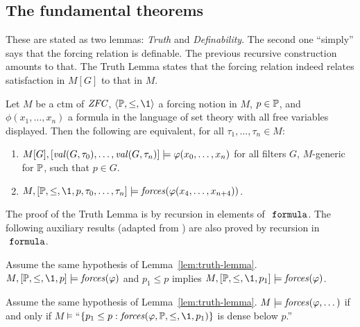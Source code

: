 \subsection{The fundamental theorems}
These are stated as two lemmas: \emph{Truth} and
\emph{Definability}. The second one ``simply'' says that the forcing
relation is definable. The previous recursive construction amounts to
that. The Truth Lemma states that the forcing relation indeed relates
satisfaction in $M[G]$ to that in $M$. 
\begin{lemma}\label{lem:truth-lemma}
  Let $M$ be a ctm of $\mathit{ZFC}$, $\lb\PP,\leq,\1\rb$ a forcing notion
  in $M$, $p\in\mathbb{P}$, and $\phi(x_1,\dots,x_n)$ a formula in the
  language of set 
  theory with all free variables displayed. Then the
  following are equivalent, for all $\tau_1,\dots,\tau_n\in M$: 
  \begin{enumerate}
  \item $M[G],[\operatorname{\mathit{val}}(G,\tau_0),\dots,\operatorname{\mathit{val}}(G,\tau_n)]
  \models\varphi(x_0,\dots,x_n)$ for 
    all filters $G$, $M$-generic for $\mathbb{P}$, such that $p\in G$.
  \item $  M,[\PP,\leq,\1,p,\tau_0,\dots,\tau_n] 
  \models\forceisa(\phi(x_4,\dots,x_{n+4}))$.
  \end{enumerate}
\end{lemma}
The proof of the Truth Lemma is by recursion in elements of
$\formula$. The following auxiliary results (adapted from
\cite[IV.2.43]{kunen2011set}) are also proved by recursion in
$\formula$.
\begin{lemma}[Strenghtening]\label{lem:strengthen} 
  Assume the same hypothesis of Lemma~\ref{lem:truth-lemma}.
  $M, [\PP,\leq,\1,p]\models\forceisa(\phi)$ and $p_1\leq p$
  implies $M, [\PP,\leq,\1,p_1]\models\forceisa(\phi)$.
\end{lemma}
\begin{lemma}[Density]\label{lem:density}
  Assume the same hypothesis of
  Lemma~\ref{lem:truth-lemma}. $M\models\mathop{\mathit{forces}}(\varphi,\dots)$ 
  if and only if 
  $M\models$``$\{p_1\leq p : \forceisa(\phi,\PP,\leq,\1,p_1)\}$ is
  dense below $p$.''
\end{lemma}

